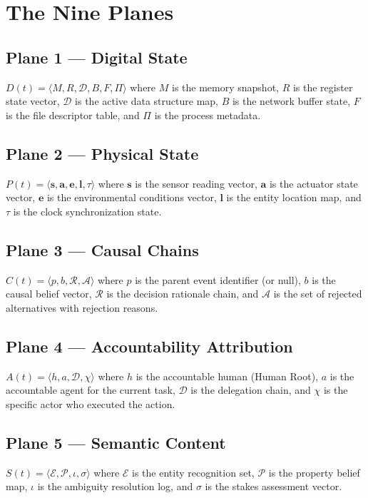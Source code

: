 \documentclass[12pt]{article}
\begin{document}
\section{The Nine Planes}
\label{sec:nine-planes}

\subsection{Plane 1 --- Digital State}
$D(t) = \langle M, R, \mathcal{D}, B, F, \Pi \rangle$ where $M$ is the memory snapshot, $R$ is the register state vector, $\mathcal{D}$ is the active data structure map, $B$ is the network buffer state, $F$ is the file descriptor table, and $\Pi$ is the process metadata.

\subsection{Plane 2 --- Physical State}
$P(t) = \langle \mathbf{s}, \mathbf{a}, \mathbf{e}, \mathbf{l}, \tau \rangle$ where $\mathbf{s}$ is the sensor reading vector, $\mathbf{a}$ is the actuator state vector, $\mathbf{e}$ is the environmental conditions vector, $\mathbf{l}$ is the entity location map, and $\tau$ is the clock synchronization state.

\subsection{Plane 3 --- Causal Chains}
$C(t) = \langle p, b, \mathcal{R}, \mathcal{A} \rangle$ where $p$ is the parent event identifier (or null), $b$ is the causal belief vector, $\mathcal{R}$ is the decision rationale chain, and $\mathcal{A}$ is the set of rejected alternatives with rejection reasons.

\subsection{Plane 4 --- Accountability Attribution}
$A(t) = \langle h, a, \mathcal{D}, \chi \rangle$ where $h$ is the accountable human (Human Root), $a$ is the accountable agent for the current task, $\mathcal{D}$ is the delegation chain, and $\chi$ is the specific actor who executed the action.

\subsection{Plane 5 --- Semantic Content}
$S(t) = \langle \mathcal{E}, \mathcal{P}, \iota, \sigma \rangle$ where $\mathcal{E}$ is the entity recognition set, $\mathcal{P}$ is the property belief map, $\iota$ is the ambiguity resolution log, and $\sigma$ is the stakes assessment vector.
\end{document}
